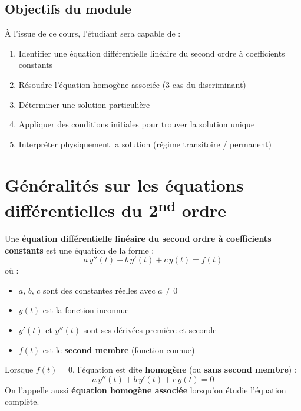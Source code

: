 \documentclass[a4paper,11pt]{article}
\begin{document}
\subsection{Objectifs du module}
À l'issue de ce cours, l'étudiant sera capable de :
\begin{enumerate}
  \item Identifier une équation différentielle linéaire du second ordre à coefficients constants
  \item Résoudre l'équation homogène associée (3 cas du discriminant)
  \item Déterminer une solution particulière
  \item Appliquer des conditions initiales pour trouver la solution unique
  \item Interpréter physiquement la solution (régime transitoire / permanent)
\end{enumerate}

\newpage
\section{Généralités sur les équations différentielles du 2\textsuperscript{nd} ordre}

\begin{definition}
Une \textbf{équation différentielle linéaire du second ordre à coefficients constants} est une équation de la forme :
\[
\boxed{a\,y''(t) + b\,y'(t) + c\,y(t) = f(t)}
\]
où :
\begin{itemize}
  \item $a$, $b$, $c$ sont des constantes réelles avec $a \neq 0$
  \item $y(t)$ est la fonction inconnue
  \item $y'(t)$ et $y''(t)$ sont ses dérivées première et seconde
  \item $f(t)$ est le \textbf{second membre} (fonction connue)
\end{itemize}
\end{definition}

\begin{definition}
Lorsque $f(t) = 0$, l'équation est dite \textbf{homogène} (ou \textbf{sans second membre}) :
\[
a\,y''(t) + b\,y'(t) + c\,y(t) = 0
\]
On l'appelle aussi \textbf{équation homogène associée} lorsqu'on étudie l'équation complète.
\end{definition}
\end{document}
